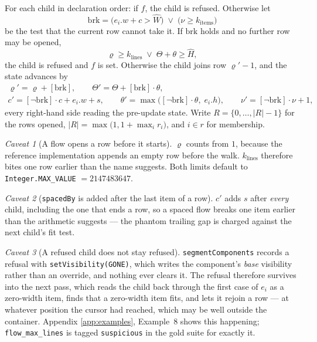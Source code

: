 \documentclass[11pt,a4paper]{article}
\newcommand{\jv}[1]{\texttt{#1}}       %
\newcommand{\file}[1]{\texttt{#1}}
\theoremstyle{definition}
\theoremstyle{plain}
\theoremstyle{remark}
\newtheorem{warning}{Caveat}[section]
\begin{document}
For each child in declaration order: if $f$, the child is refused. Otherwise let
\[
  \mathrm{brk} = \bigl(e_i.w + c > \hat W\bigr) \;\vee\; \bigl(\nu \geq k_{\mathrm{items}}\bigr)
\]
be the test that the current row cannot take it. If $\mathrm{brk}$ holds and no
further row may be opened,
\[
  \varrho \geq k_{\mathrm{lines}} \;\vee\; \Theta + \theta \geq \hat H,
\]
the child is refused and $f$ is set. Otherwise the child joins row
$\varrho' - 1$, and the state advances by
\[
  \begin{gathered}
    \varrho' = \varrho + [\mathrm{brk}], \qquad
    \Theta' = \Theta + [\mathrm{brk}]\cdot\theta, \\
    c' = [\neg\mathrm{brk}]\cdot c + e_i.w + s, \qquad
    \theta' = \max\bigl([\neg\mathrm{brk}]\cdot\theta,\; e_i.h\bigr), \qquad
    \nu' = [\neg\mathrm{brk}]\cdot\nu + 1,
  \end{gathered}
\]
every right-hand side reading the pre-update state. Write
$R = \{0, \ldots, |R| - 1\}$ for the rows opened, $|R| = \max\bigl(1, 1 + \max_i
r_i\bigr)$, and $i \in r$ for membership.

\begin{warning}[A flow opens a row before it starts]
$\varrho$ counts from $1$, because the reference implementation appends an empty
row before the walk. $k_{\mathrm{lines}}$ therefore bites one row earlier than
the name suggests. Both limits default to \jv{Integer.MAX\_VALUE} $=
2147483647$.
\end{warning}

\begin{warning}[\texttt{spacedBy} is added after the last item of a row]
$c'$ adds $s$ after \emph{every} child, including the one that ends a row, so a
spaced flow breaks one item earlier than the arithmetic suggests --- the phantom
trailing gap is charged against the next child's fit test.
\end{warning}

\begin{warning}[A refused child does not stay refused]
\label{sec:flowsticky}
\jv{segmentComponents} records a refusal with \jv{setVisibility(GONE)}, which
writes the component's \emph{base} visibility rather than an override, and
nothing ever clears it. The refusal therefore survives into the next pass, which
reads the child back through the first case of $e_i$ as a zero-width item, finds
that a zero-width item fits, and lets it rejoin a row --- at whatever position the
cursor had reached, which may be well outside the container. Appendix
\ref{app:examples}, Example~8 shows this happening; \file{flow\_max\_lines} is
tagged \jv{suspicious} in the gold suite for exactly it.
\end{warning}
\end{document}
